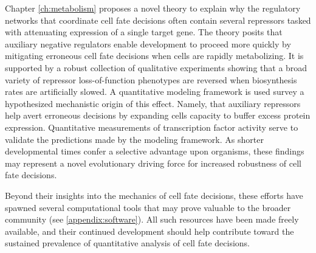 Chapter \ref{ch:metabolism} proposes a novel theory to explain why the regulatory networks that coordinate cell fate decisions often contain several repressors tasked with attenuating expression of a single target gene. The theory posits that auxiliary negative regulators enable development to proceed more quickly by mitigating erroneous cell fate decisions when cells are rapidly metabolizing. It is supported by a robust collection of qualitative experiments showing that a broad variety of repressor loss-of-function phenotypes are reversed when biosynthesis rates are artificially slowed. A quantitative modeling framework is used survey a hypothesized mechanistic origin of this effect. Namely, that auxiliary repressors help avert erroneous decisions by expanding cells capacity to buffer excess protein expression. Quantitative measurements of transcription factor activity serve to validate the predictions made by the modeling framework. As shorter developmental times confer a selective advantage upon organisms, these findings may represent a novel evolutionary driving force for increased robustness of cell fate decisions.

Beyond their insights into the mechanics of cell fate decisions, these efforts have spawned several computational tools that may prove valuable to the broader community (see \ref{appendix:software}). All such resources have been made freely available, and their continued development should help contribute toward the sustained prevalence of quantitative analysis of cell fate decisions.




